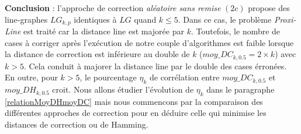 {\bf Conclusion} : l'approche de correction {\em al\'eatoire sans remise} $(2c)$ propose des line-graphes $LG_{k,p}$  identiques \`a $LG$ quand $k \le 5$. Dans ce cas, le probl\`eme {\em Proxi-Line} est trait\'e car la distance line est major\'ee par $k$. 
Toutefois, le nombre de cases \`a corriger apr\`es l'ex\'ecution de notre couple d'algorithmes est faible lorsque la distance de correction est inf\'erieure au double de $k$ ($moy\_DC_{k,0.5} = 2 \times k$) avec $k>5$. Cela conduit \`a majorer la distance line par le double des cases \'erron\'ees.
En outre, pour $k>5$, le pourcentage  $\eta_k$ de corr\'elation entre $moy\_DC_{k,0.5}$ et $moy\_DH_{k,0.5}$ croit. Nous allons \'etudier l'\'evolution de $\eta_k$  dans le paragraphe \ref{relationMoyDHmoyDC} mais nous commencons par la comparaison des diff\'erentes approches de correction pour en d\'eduire celle qui minimise les distances de correction ou de Hamming.


